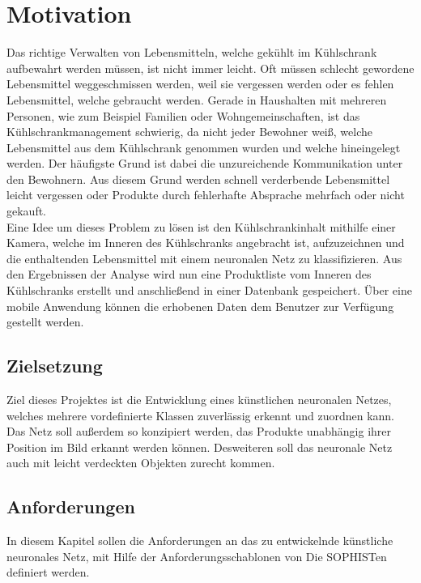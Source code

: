 \documentclass[a4paper,12pt,oneside]{article}
\begin{document}
  \newpage
  
  \tableofcontents
  \newpage
  \listoffigures
 
  
  \newpage
  \pagestyle{plain}
  \setcounter{page}{1}
   
  
  \section{Motivation}
Das richtige Verwalten von Lebensmitteln, welche gekühlt im Kühlschrank aufbewahrt werden müssen, ist nicht immer leicht. Oft müssen schlecht gewordene Lebensmittel weggeschmissen werden, weil sie vergessen werden oder es fehlen Lebensmittel, welche gebraucht werden. Gerade in Haushalten mit mehreren Personen, wie zum Beispiel Familien oder Wohngemeinschaften, ist das Kühlschrankmanagement schwierig, da nicht jeder Bewohner weiß, welche Lebensmittel aus dem Kühlschrank genommen wurden und welche hineingelegt werden. Der häufigste Grund ist dabei die unzureichende Kommunikation unter den Bewohnern. Aus diesem Grund werden schnell verderbende Lebensmittel leicht vergessen oder Produkte durch fehlerhafte Absprache mehrfach oder nicht gekauft. \\ Eine Idee um dieses Problem zu lösen ist den Kühlschrankinhalt mithilfe einer Kamera, welche im Inneren des Kühlschranks angebracht ist, aufzuzeichnen und die enthaltenden Lebensmittel mit einem neuronalen Netz zu klassifizieren. Aus den Ergebnissen der Analyse wird nun eine Produktliste vom Inneren des Kühlschranks erstellt und anschließend in einer Datenbank gespeichert. Über eine mobile Anwendung können die erhobenen Daten dem Benutzer zur Verfügung gestellt werden.
  
  \subsection{Zielsetzung} 
Ziel dieses Projektes ist die Entwicklung eines künstlichen neuronalen Netzes, welches mehrere vordefinierte Klassen zuverlässig erkennt und zuordnen kann. Das Netz soll außerdem so konzipiert werden, das Produkte unabhängig ihrer Position im Bild erkannt werden können. Desweiteren soll das neuronale Netz auch mit leicht verdeckten Objekten zurecht kommen.

\newpage
	
  \subsection{Anforderungen}
In diesem Kapitel sollen die Anforderungen an das zu entwickelnde künstliche neuronales Netz, mit Hilfe der Anforderungsschablonen von \glqq Die SOPHISTen\grqq \cite{sophisten2013schablonen} definiert werden. 
  
\end{document}
